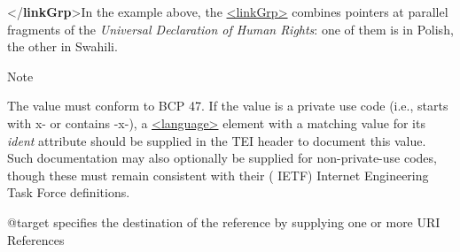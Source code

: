 \begin{reflist}
\begin{sansreflist}
\begin{reflist}
\mbox{}\newline 
{}\mbox{}\newline 
{</\textbf{linkGrp}>}In the example above, the \hyperref[TEI.linkGrp]{<linkGrp>} combines pointers at parallel fragments of the \textit{Universal Declaration of Human Rights}: one of them is in Polish, the other in Swahili.
    \item[{Note}]
  \par
The value must conform to BCP 47. If the value is a private use code (i.e., starts with x- or contains -x-), a \hyperref[TEI.language]{<language>} element with a matching value for its {\itshape ident} attribute should be supplied in the TEI header to document this value. Such documentation may also optionally be supplied for non-private-use codes, though these must remain consistent with their  ( {\abbr IETF}) {\expan Internet Engineering Task Force} definitions.
\end{reflist}  
    \item[@target]
  specifies the destination of the reference by supplying one or more URI References

\end{sansreflist}
\end{reflist}
